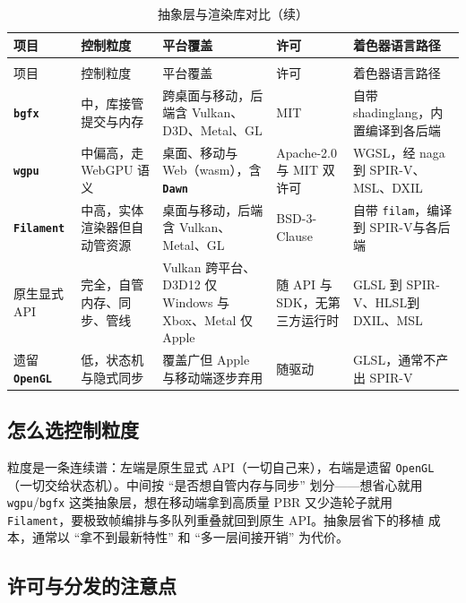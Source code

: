 \documentclass[12pt,a4paper,fontset=fandol]{ctexbook}
\newcommand{\Tp}[1]{\texttt{#1}}
\newcommand{\Bk}{\discretionary{}{}{}}
\newcommand{\Lib}[1]{\textbf{\texttt{#1}}}
\newcommand{\Lang}[1]{\textsf{#1}}
\newcommand{\GSL}{\Lang{GLSL}}
\newcommand{\HSL}{\Lang{HLSL}}
\newcommand{\MSL}{\Lang{MSL}}
\newcommand{\SPIV}{\Lang{SPIR-V}}
\begin{document}
\begin{longtable}{>{\raggedright\arraybackslash}p{}
                  >{\raggedright\arraybackslash}p{}
                  >{\raggedright\arraybackslash}p{}
                  >{\raggedright\arraybackslash}p{}
                  >{\raggedright\arraybackslash}p{}}
\caption{抽象层与渲染库对比}\label{tab:apC-lib} \\
\toprule
项目 & 控制粒度 & 平台覆盖 & 许可 & 着色器语言路径 \\
\midrule
\endfirsthead
\caption[]{抽象层与渲染库对比（续）}\\
\toprule
项目 & 控制粒度 & 平台覆盖 & 许可 & 着色器语言路径 \\
\midrule
\endhead
\bottomrule
\endfoot
\Lib{bgfx} & 中，库接管提交与内存 & 跨桌面与移动，后端含 Vulkan、D3D、Metal、GL & MIT & 自带 shadinglang，内置编译到各后端 \\
\Lib{wgpu} & 中偏高，走 WebGPU 语义 & 桌面、移动与 Web（wasm），含 \Lib{Dawn} & Apache-2.0 与 MIT 双许可 & WGSL，经 naga 到 \SPIV、MSL、DXIL \\
\Lib{Filament} & 中高，实体渲染器但自动管资源 & 桌面与移动，后端含 Vulkan、Metal、GL & BSD-3-Clause & 自带 \Tp{filam}，编译到 \SPIV 与各后端 \\
原生显式 API & 完全，自管内存、同步、管线 & Vulkan 跨平台、D3D12 仅 Windows 与 Xbox、Metal 仅 Apple & 随 API 与 SDK，无第三方运行时 & GLSL 到 \SPIV、\HSL 到 DXIL、\MSL \\
遗留 \Lib{OpenGL} & 低，状态机与隐式同步 & 覆盖广但 Apple 与移动端逐步弃用 & 随驱动 & \GSL，通常不产出 \SPIV \\
\end{longtable}

\subsection{怎么选控制粒度}

粒度是一条连续谱：左端是原生显式 API（一切自己来），右端是遗留 \Tp{OpenGL}
（一切交给状态机）。中间按 ``是否想自管内存与同步'' 划分——想省心就用
\Tp{wgpu}/{\Bk}\Tp{bgfx} 这类抽象层，想在移动端拿到高质量 PBR 又少造轮子就用
\Tp{Filament}，要极致帧编排与多队列重叠就回到原生 API。抽象层省下的移植
成本，通常以 ``拿不到最新特性'' 和 ``多一层间接开销'' 为代价。

\subsection{许可与分发的注意点}
\end{document}
